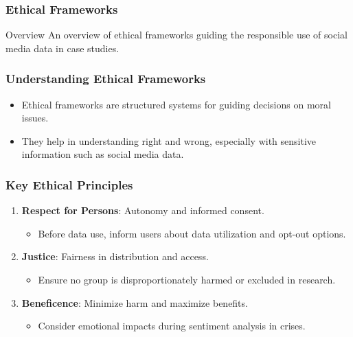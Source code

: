 \documentclass{beamer}
\begin{document}
\begin{frame}[fragile]
    \frametitle{Ethical Frameworks}
    \begin{block}{Overview}
        An overview of ethical frameworks guiding the responsible use of social media data in case studies.
    \end{block}
\end{frame}

\begin{frame}[fragile]
    \frametitle{Understanding Ethical Frameworks}
    \begin{itemize}
        \item Ethical frameworks are structured systems for guiding decisions on moral issues.
        \item They help in understanding right and wrong, especially with sensitive information such as social media data.
    \end{itemize}
\end{frame}

\begin{frame}[fragile]
    \frametitle{Key Ethical Principles}
    \begin{enumerate}
        \item \textbf{Respect for Persons}: Autonomy and informed consent.
            \begin{itemize}
                \item Before data use, inform users about data utilization and opt-out options.
            \end{itemize}
        \item \textbf{Justice}: Fairness in distribution and access.
            \begin{itemize}
                \item Ensure no group is disproportionately harmed or excluded in research.
            \end{itemize}
        \item \textbf{Beneficence}: Minimize harm and maximize benefits.
            \begin{itemize}
                \item Consider emotional impacts during sentiment analysis in crises.
            \end{itemize}
    \end{enumerate}
\end{frame}
\end{document}
